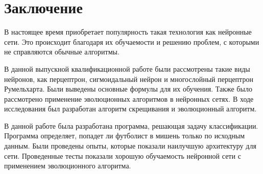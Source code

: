 \newpage

\chapter*{Заключение}

  \indent \indent В настоящее время приобретает популярность такая технология как нейронные сети. Это происходит благодаря их обучаемости и решению проблем, с которыми не справляются обычные алгоритмы.

  В данной выпускной квалификационной работе были рассмотрены такие виды нейронов, как перцептрон, сигмоидальный нейрон и многослойный перцептрон Румельхарта. Были выведены основные формулы для их обучения. Также было рассмотрено применение эволюционных алгоритмов в нейронных сетях. В ходе исследования был разработан алгоритм скрещивания и эволюционный алгоритм.

  В данной работе была разработана программа, решающая задачу классификации. Программа определяет, попадет ли футболист в мишень только по исходным данным. Были проведены опыты, которые показали наилучшую архитектуру для сети. Проведенные тесты показали хорошую обучаемость нейронной сети с применением эволюционного алгоритма.